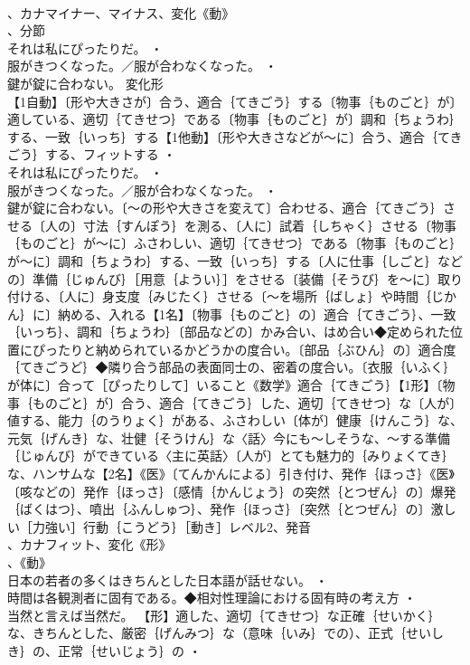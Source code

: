 \documentclass[8pt]{extreport}
\begin{document}
\begin{CJK}{UTF8}{min}
\\	、カナマイナー、マイナス、変化《動》
\\	、分節
\\	それは私にぴったりだ。 ・
\\	服がきつくなった。／服が合わなくなった。 ・
\\	鍵が錠に合わない。	変化形 
\\	【1自動】〔形や大きさが〕合う、適合｛てきごう｝する〔物事｛ものごと｝が〕適している、適切｛てきせつ｝である〔物事｛ものごと｝が〕調和｛ちょうわ｝する、一致｛いっち｝する【1他動】〔形や大きさなどが～に〕合う、適合｛てきごう｝する、フィットする ・
\\	それは私にぴったりだ。 ・
\\	服がきつくなった。／服が合わなくなった。 ・
\\	鍵が錠に合わない。〔～の形や大きさを変えて〕合わせる、適合｛てきごう｝させる〔人の〕寸法｛すんぽう｝を測る、〔人に〕試着｛しちゃく｝させる〔物事｛ものごと｝が～に〕ふさわしい、適切｛てきせつ｝である〔物事｛ものごと｝が～に〕調和｛ちょうわ｝する、一致｛いっち｝する〔人に仕事｛しごと｝などの〕準備｛じゅんび｝［用意｛ようい｝］をさせる〔装備｛そうび｝を～に〕取り付ける、〔人に〕身支度｛みじたく｝させる〔～を場所｛ばしょ｝や時間｛じかん｝に〕納める、入れる【1名】〔物事｛ものごと｝の〕適合｛てきごう｝、一致｛いっち｝、調和｛ちょうわ｝〔部品などの〕かみ合い、はめ合い◆定められた位置にぴったりと納められているかどうかの度合い。〔部品｛ぶひん｝の〕適合度｛てきごうど｝◆隣り合う部品の表面同士の、密着の度合い。〔衣服｛いふく｝が体に〕合って［ぴったりして］いること《数学》適合｛てきごう｝【1形】〔物事｛ものごと｝が〕合う、適合｛てきごう｝した、適切｛てきせつ｝な〔人が〕値する、能力｛のうりょく｝がある、ふさわしい〔体が〕健康｛けんこう｝な、元気｛げんき｝な、壮健｛そうけん｝な〈話〉今にも～しそうな、～する準備｛じゅんび｝ができている〈主に英話〉〔人が〕とても魅力的｛みりょくてき｝な、ハンサムな【2名】《医》〔てんかんによる〕引き付け、発作｛ほっさ｝《医》〔咳などの〕発作｛ほっさ｝〔感情｛かんじょう｝の突然｛とつぜん｝の〕爆発｛ばくはつ｝、噴出｛ふんしゅつ｝、発作｛ほっさ｝〔突然｛とつぜん｝の〕激しい［力強い］行動｛こうどう｝［動き］レベル2、発音
\\	、カナフィット、変化《形》
\\	、《動》
\\	日本の若者の多くはきちんとした日本語が話せない。 ・
\\	時間は各観測者に固有である。◆相対性理論における固有時の考え方 ・
\\	当然と言えば当然だ。		【形】適した、適切｛てきせつ｝な正確｛せいかく｝な、きちんとした、厳密｛げんみつ｝な（意味｛いみ｝での）、正式｛せいしき｝の、正常｛せいじょう｝の ・

\end{CJK}
\end{document}
